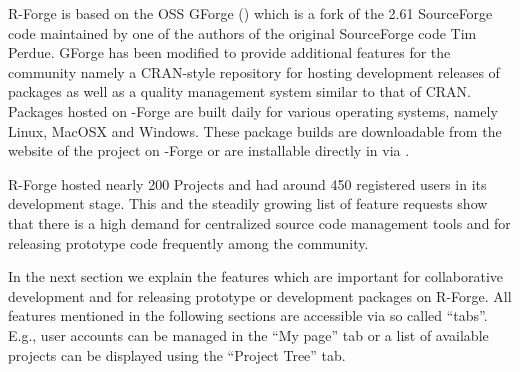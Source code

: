 R-Forge is based on the OSS GForge (\citep{forge:copeland_et_al:2006}) which is a
fork of the 2.61 SourceForge code maintained by one of the authors of
the original SourceForge code Tim Perdue. GForge has been modified to
provide additional features for the \R{} community namely a
CRAN-style repository for hosting development releases of \R{}
packages as well as a quality management system similar to that of
CRAN.
Packages hosted on \R{}-Forge are built daily
for various operating systems, namely Linux, MacOSX and Windows. These
package builds are downloadable from the website of the project on
\R{}-Forge or are installable directly in \R{} via
.





R-Forge hosted nearly 200 Projects and had around 450
registered users in its development stage. This and the steadily growing list of
feature requests show that there is a high demand for centralized source code
management tools and for releasing prototype code frequently among the
\R{} community.

In the next section we explain the features which are important for
collaborative development and for releasing prototype or development
packages on R-Forge.
All features mentioned in the following sections are accessible via so called
``tabs''. E.g., user accounts can be managed in the ``My page'' tab or
a list of available projects can be displayed using the ``Project Tree'' tab. 


